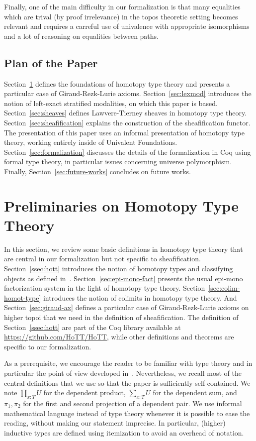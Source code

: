 \documentclass[conference]{IEEEtran}
\begin{document}
Finally, one of the main difficulty in our formalization is that many
equalities which are trival (by proof irrelevance) in the topos theoretic
setting becomes relevant and requires a carreful use of univalence
with appropriate isomorphisms and a lot of reasoning on equalities
between paths.

\subsection{Plan of the Paper}

Section~\ref{sec:hott} defines the foundations of homotopy type theory
and presents a particular case of Giraud-Rezk-Lurie axioms. 
%
Section~\ref{sec:lexmod} introduces the notion of left-exact stratified
modalities, on which this paper is based.
%
Section~\ref{sec:sheaves} defines Lawvere-Tierney sheaves in homotopy
type theory.
%
Section~\ref{sec:sheafification} explains the construction of the
sheafification functor.
%
The presentation of this paper uses an informal presentation of
homotopy type theory, working entirely inside of Univalent
Foundations. 
Section~\ref{sec:formalization} discusses the details of the
formalization in Coq using formal type theory, in particular issues
concerning universe polymorphism.
%
Finally, Section~\ref{sec:future-works} concludes on future works.


\section{Preliminaries on Homotopy Type Theory}
\label{sec:hott}

In this section, we review some basic definitions in homotopy type
theory that are central in our formalization but not specific to
sheafification. 
%
Section~\ref{ssec:hott} introduces the notion of homotopy types and
classifying objects as defined in~\cite{sets_in_hott}.
%
Section~\ref{sec:epi-mono-fact} presents the usual epi-mono
factorization system in the light of homotopy type theory.
%
Section~\ref{sec:colim-homot-type} introduces the notion of colimits
in homotopy type theory. 
%
And Section~\ref{sec:giraud-ax} defines a particular case of
Giraud-Rezk-Lurie axioms on higher topoi that we need in the
definition of sheafification.
%
The definition of Section~\ref{ssec:hott} are part of the Coq library
available at \url{https://github.com/HoTT/HoTT}, while other definitions
and theorems are specific to our formalization. 

As a prerequisite, we encourage the reader to be familiar with type theory and
in particular the point of view developed
in~\cite{hottbook}. Nevertheless, we recall most of the central definitions 
that we use so that the paper is sufficiently self-contained.
%
We note $\prod_{x:T} U$ for the dependent product, $\sum_{x:T} U$ for
the dependent sum, and $\pi_1, \pi_2$ for the first and second
projection of a dependent pair. We use informal mathematical language
instead of type theory whenever it is possible to ease the
reading, without making our statement imprecise. In particular,
(higher) inductive types are defined using itemization to avoid an
overhead of notation.
 
\end{document}
